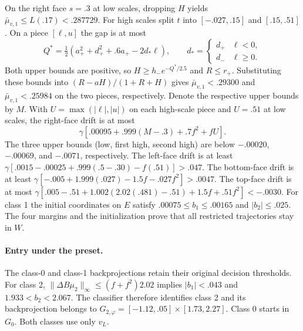 On the right face $s=.3$ at low scales, dropping $H$ yields
$\bar\mu_{v,1}\le L(.17)<.287729$.
For high scales split $t$ into $[-.027,.15]$ and $[.15,.51]$.
On a piece $[\ell,u]$ the gap is at most
\[
 Q^*=\tfrac12(a_+^2+d_+^2+.6a_+-2d_*\ell),
 \qquad
 d_*=\begin{cases}d_+&\ell<0,\\d_-&\ell\ge0.\end{cases}
\]
Both upper bounds are positive, so
$H\ge h_-e^{-Q^*/2.5}$ and $R\le r_+$.
Substituting these bounds into $(R-aH)/(1+R+H)$ gives
$\bar\mu_{v,1}<.29300$ and $\bar\mu_{v,1}<.25984$ on the
two pieces, respectively. Denote the respective upper bounds by $M$. With $U=\max(|\ell|,|u|)$
on each high-scale piece and $U=.51$ at low scales, the
right-face drift is at most
\[
 \gamma[.00095+.999(M-.3)+.7f^2+fU].
\]
The three upper bounds (low, first high, second high) are below
$-.00020$, $-.00069$, and $-.0071$, respectively.
The left-face drift is at least
$\gamma[.0015-.00025+.999(.5-.30)-f(.51)]>.047$.
The bottom-face drift is at least
$\gamma[-.005+1.999(.027)-1.5f-.027f^2]>.0047$.
The top-face drift is at most
$\gamma[.005-.51+1.002(2.02(.481)-.51)+1.5f+.51f^2]<-.0030$.
For class 1 the initial coordinates on $E$ satisfy
$.00075\le b_1\le.00165$ and $|b_2|\le.025$.
The four margins and the initialization prove that all
restricted trajectories stay in $W$.

\paragraph{Entry under the preset.}
The class-0 and class-1 backprojections retain their original
decision thresholds. For class 2,
$\|\Delta B\mu_2\|_\infty\le(f+f^2)2.02$ implies
$|b_1|<.043$ and $1.933<b_2<2.067$. The classifier therefore
identifies class 2 and its backprojection belongs to
$G_{2,\varphi}=[-1.12,.05]\times[1.73,2.27]$.
Class 0 starts in $G_0$. Both classes use only $v_L$.

